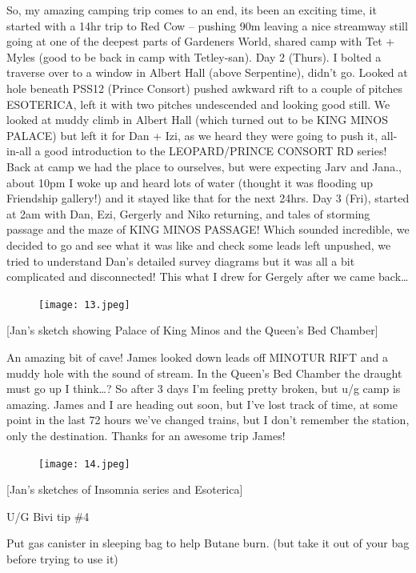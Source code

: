 So, my amazing camping trip comes to an end, its been an exciting time,
it started with a 14hr trip to Red Cow -- pushing 90m leaving a nice
streamway still going at one of the deepest parts of Gardeners World,
shared camp with Tet + Myles (good to be back in camp with Tetley-san).
Day 2 (Thurs). I bolted a traverse over to a window in Albert Hall
(above Serpentine), didn't go. Looked at hole beneath PSS12 (Prince
Consort) pushed awkward rift to a couple of pitches ESOTERICA, left it
with two pitches undescended and looking good still. We looked at muddy
climb in Albert Hall (which turned out to be KING MINOS PALACE) but left
it for Dan + Izi, as we heard they were going to push it, all-in-all a
good introduction to the LEOPARD/PRINCE CONSORT RD series! Back at camp
we had the place to ourselves, but were expecting Jarv and Jana., about
10pm I woke up and heard lots of water (thought it was flooding up
Friendship gallery!) and it stayed like that for the next 24hrs. Day 3
(Fri), started at 2am with Dan, Ezi, Gergerly and Niko returning, and
tales of storming passage and the maze of KING MINOS PASSAGE! Which
sounded incredible, we decided to go and see what it was like and check
some leads left unpushed, we tried to understand Dan's detailed survey
diagrams but it was all a bit complicated and disconnected! This what I
drew for Gergely after we came back\ldots{}

\begin{figure}[htbp]
\centering
\texttt{[image: 13.jpeg]}
\caption{}
\end{figure}

{[}Jan's sketch showing Palace of King Minos and the Queen's Bed
Chamber{]}

An amazing bit of cave! James looked down leads off MINOTUR RIFT and a
muddy hole with the sound of stream. In the Queen's Bed Chamber the
draught must go up I think\ldots{}? So after 3 days I'm feeling pretty
broken, but u/g camp is amazing. James and I are heading out soon, but
I've lost track of time, at some point in the last 72 hours we've
changed trains, but I don't remember the station, only the destination.
Thanks for an awesome trip James!

\begin{figure}[htbp]
\centering
\texttt{[image: 14.jpeg]}
\caption{}
\end{figure}

{[}Jan's sketches of Insomnia series and Esoterica{]}

U/G Bivi tip \#4

Put gas canister in sleeping bag to help Butane burn. (but take it out
of your bag before trying to use it)

